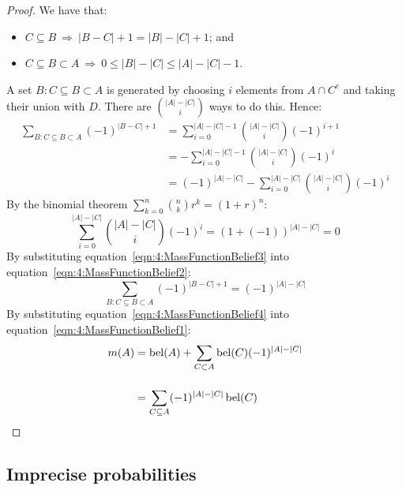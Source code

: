 \begin{thm}
\begin{proof}
    We have that:
    \begin{itemize}
      \item $C \subseteq B \ \Rightarrow\  |B - C| + 1 = |B| - |C| + 1$; and
      \item $C \subseteq B \subset A \ \Rightarrow\  0 \leq |B| - |C| \leq |A| - |C| - 1$.
    \end{itemize}
    A set $B : C \subseteq B \subset A$ is generated by choosing $i$
    elements from $A \cap C^c$ and taking their union with $D$.
    There are $\binom{|A| - |C|}{i}$ ways to do this.
    Hence:
    \begin{align}
      \label{eqn:4:MassFunctionBelief2}
      \sum_{B : C \subseteq B \subset A} (-1)^{|B - C| + 1}
       & = \sum_{i = 0}^{|A| - |C| - 1} \binom{|A| - |C|}{i} (-1)^{i + 1} \nonumber   \\[3ex]
       & = - \sum_{i = 0}^{|A| - |C| - 1} \binom{|A| - |C|}{i} (-1)^{i} \nonumber     \\[3ex]
       & = (- 1)^{|A| - |C|} - \sum_{i = 0}^{|A| - |C|} \binom{|A| - |C|}{i} (-1)^{i}
    \end{align}
    By the binomial theorem $\sum_{k = 0}^{n} \binom{n}{k} r^{k} = (1 + r)^{n}$:
    \begin{equation}
      \label{eqn:4:MassFunctionBelief3}
      \sum_{i = 0}^{|A| - |C|} \binom{|A| - |C|}{i} (-1)^{i}
      = (1 + (- 1))^{|A| - |C|}
      = 0
    \end{equation}
    By substituting equation~\ref{eqn:4:MassFunctionBelief3} into
    equation~\ref{eqn:4:MassFunctionBelief2}:
    \begin{equation}
      \label{eqn:4:MassFunctionBelief4}
      \sum_{B : C \subseteq B \subset A} (-1)^{|B - C| + 1}
      = (- 1)^{|A| - |C|}
    \end{equation}
    By substituting equation~\ref{eqn:4:MassFunctionBelief4} into
    equation~\ref{eqn:4:MassFunctionBelief1}:
    \begin{align*}
      m(A)
       & = \operatorname*{bel}(A) + \sum_{C \subset A} \operatorname*{bel}(C) (- 1)^{|A| - |C|} \\[3ex]
       & = \sum_{C \subseteq A}  (- 1)^{|A| - |C|} \operatorname*{bel}(C)
    \end{align*}
  \end{proof}
\end{thm}

\subsection{Imprecise probabilities}

